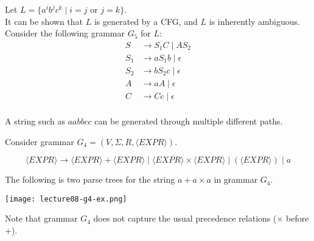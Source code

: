 \documentclass[11pt,a4paper]{article}
\begin{document}
\begin{example}
    Let $L=\{a^ib^jc^k\mid i=j\text{ or }j=k\}$. \\

    It can be shown that $L$ is generated by a CFG, and $L$ is inherently ambiguous. Consider the following grammar $G_5$ for $L$:
    \begin{align*}
        S & \rightarrow S_1C\mid AS_2 \\
        S_1 & \rightarrow aS_1b\mid\epsilon \\
        S_2 & \rightarrow bS_2c\mid\epsilon \\
        A & \rightarrow aA\mid\epsilon \\
        C & \rightarrow Cc\mid\epsilon \\
    \end{align*}

    A string such as $aabbcc$ can be generated through multiple different paths.
\end{example}

\begin{example}
    Consider grammar $G_4=(V,\Sigma,R,\langle EXPR\rangle)$.

    $$\langle EXPR\rangle\rightarrow \langle EXPR\rangle+\langle EXPR\rangle\mid\langle EXPR\rangle\times\langle EXPR\rangle\mid (\langle EXPR\rangle)\mid a$$

    The following is two parse trees for the string $a+a\times a$ in grammar $G_4$.

    \texttt{[image: lecture08-g4-ex.png]}

    Note that grammar $G_4$ does not capture the usual precedence relations ($\times$ before +).
\end{example}
\end{document}
